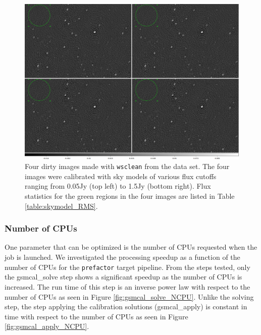 \documentclass[preprint,5p]{elsarticle}
\begin{document}
\begin{figure}
    \includegraphics[width=0.95\linewidth]{figures/skymodel_images.png}
      \caption{Four dirty images made with \texttt{wsclean} from the data set. The four images were calibrated with sky models of various flux cutoffs ranging from 0.05Jy (top left) to 1.5Jy (bottom right). Flux statistics for the green regions in the four images are listed in Table \ref{table:skymodel_RMS}.}
	\label{fig:skymodel_images}
\end{figure}

\subsubsection{Number of CPUs}
One parameter that can be optimized is the number of CPUs requested when the job is launched. We investigated the processing speedup as a function of the number of CPUs for the \texttt{prefactor} target pipeline. From the steps tested, only the gsmcal\_solve step shows a significant speedup as the number of CPUs is increased. The run time of this step is an inverse power law with respect to the number of CPUs as seen in Figure \ref{fig:gsmcal_solve_NCPU}. Unlike the solving step, the step applying the calibration solutions (gsmcal\_apply) is constant in time with respect to the number of CPUs as seen in Figure \ref{fig:gsmcal_apply_NCPU}. 
\end{document}
